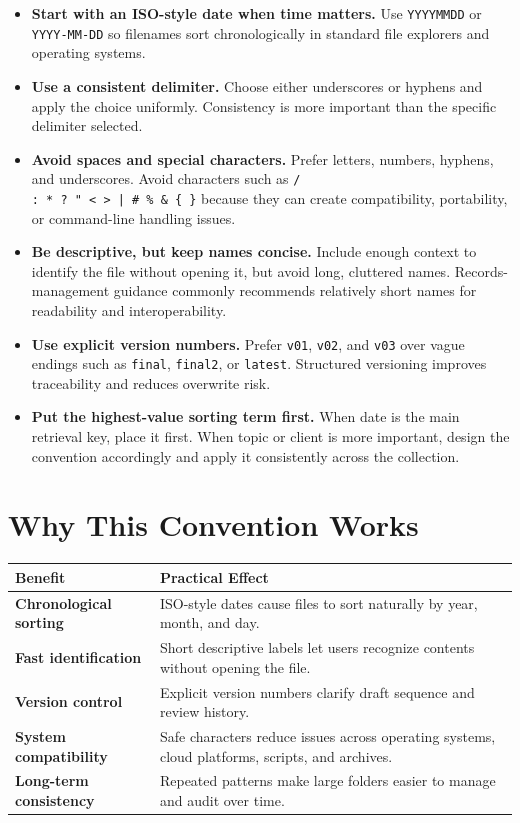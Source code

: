 \documentclass[11pt,letterpaper]{article}
\newcommand{\code}[1]{\texttt{#1}}
\begin{document}
\begin{itemize}
  \item \textbf{Start with an ISO-style date when time matters.} Use \code{YYYYMMDD} or \code{YYYY-MM-DD} so filenames sort chronologically in standard file explorers and operating systems.\cite{harvard,illinois}
  \item \textbf{Use a consistent delimiter.} Choose either underscores or hyphens and apply the choice uniformly. Consistency is more important than the specific delimiter selected.\cite{harvard,purdue}
  \item \textbf{Avoid spaces and special characters.} Prefer letters, numbers, hyphens, and underscores. Avoid characters such as \code{/ \\ : * ? " < > | \# \% \& \{ \}} because they can create compatibility, portability, or command-line handling issues.\cite{nara,purdue}
  \item \textbf{Be descriptive, but keep names concise.} Include enough context to identify the file without opening it, but avoid long, cluttered names. Records-management guidance commonly recommends relatively short names for readability and interoperability.\cite{nara,harvard}
  \item \textbf{Use explicit version numbers.} Prefer \code{v01}, \code{v02}, and \code{v03} over vague endings such as \code{final}, \code{final2}, or \code{latest}. Structured versioning improves traceability and reduces overwrite risk.\cite{purdue,harvard}
  \item \textbf{Put the highest-value sorting term first.} When date is the main retrieval key, place it first. When topic or client is more important, design the convention accordingly and apply it consistently across the collection.\cite{harvard,nara}
\end{itemize}

\section*{Why This Convention Works}

\begin{tabularx}{\textwidth}{>{\bfseries}p{1.7in}X}
\toprule
Benefit & Practical Effect \\
\midrule
Chronological sorting & ISO-style dates cause files to sort naturally by year, month, and day. \\
Fast identification & Short descriptive labels let users recognize contents without opening the file. \\
Version control & Explicit version numbers clarify draft sequence and review history. \\
System compatibility & Safe characters reduce issues across operating systems, cloud platforms, scripts, and archives. \\
Long-term consistency & Repeated patterns make large folders easier to manage and audit over time. \\
\bottomrule
\end{tabularx}
\end{document}
